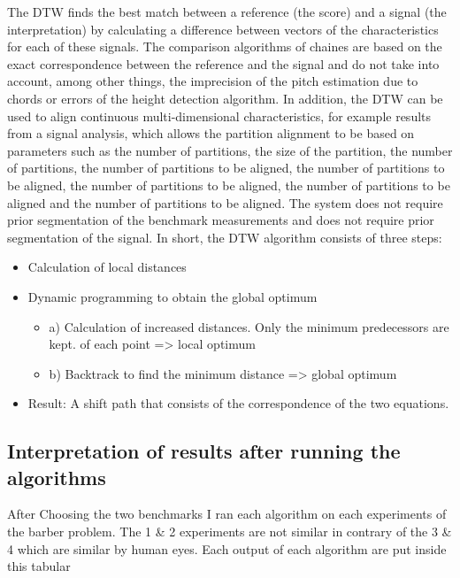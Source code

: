 \documentclass{article}
\begin{document}
 The DTW finds the best match between a reference (the score) and a signal (the interpretation) by calculating a difference between vectors of the characteristics for each of these signals. The comparison algorithms of chaines are based on the exact correspondence between the reference and the signal and do not take into account, among other things, the imprecision of the pitch estimation due to chords or errors of the height detection algorithm. In addition, the DTW can be used to align continuous multi-dimensional characteristics, for example results from a signal analysis, which allows the partition alignment to be based on parameters such as the number of partitions, the size of the partition, the number of partitions, the number of partitions to be aligned, the number of partitions to be aligned, the number of partitions to be aligned, the number of partitions to be aligned and the number of partitions to be aligned.
The system does not require prior segmentation of the benchmark measurements and does not require prior segmentation of the
signal.
In short, the DTW algorithm consists of three steps:

\begin{itemize}
    \item Calculation of local distances
    \item Dynamic programming to obtain the global optimum \begin{itemize}
        \item a) Calculation of increased distances. Only the minimum predecessors are kept. of each point => local optimum
        \item b) Backtrack to find the minimum distance => global optimum
    \end{itemize}
    \item Result: A shift path that consists of the correspondence of the two equations.

    
\end{itemize}

\subsection{Interpretation of results after running the algorithms}

After Choosing the two benchmarks I ran each algorithm on each experiments of the barber problem.
The 1 \& 2 experiments are not similar in contrary of the 3 \& 4 which are similar by human eyes.
Each output of each algorithm are put inside this tabular
\end{document}
